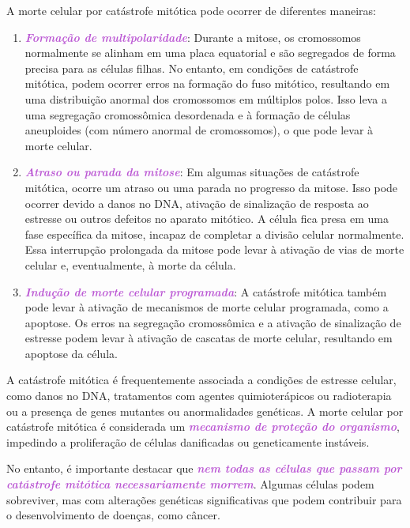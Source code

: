 \documentclass[11pt,a4paper]{article}
\begin{document}
\begin{itemize}
		A morte celular por catástrofe mitótica pode ocorrer de diferentes maneiras:
		\begin{enumerate}
			\item \textcolor{MediumOrchid}{\textbf{\textit{Formação de multipolaridade}}}: Durante a mitose, os cromossomos normalmente se alinham em uma placa equatorial e são segregados de forma precisa para as células filhas. No entanto, em condições de catástrofe mitótica, podem ocorrer erros na formação do fuso mitótico, resultando em uma distribuição anormal dos cromossomos em múltiplos polos. Isso leva a uma segregação cromossômica desordenada e à formação de células aneuploides (com número anormal de cromossomos), o que pode levar à morte celular.
			\item \textcolor{MediumOrchid}{\textbf{\textit{Atraso ou parada da mitose}}}: Em algumas situações de catástrofe mitótica, ocorre um atraso ou uma parada no progresso da mitose. Isso pode ocorrer devido a danos no DNA, ativação de sinalização de resposta ao estresse ou outros defeitos no aparato mitótico. A célula fica presa em uma fase específica da mitose, incapaz de completar a divisão celular normalmente. Essa interrupção prolongada da mitose pode levar à ativação de vias de morte celular e, eventualmente, à morte da célula.
			\item \textcolor{MediumOrchid}{\textbf{\textit{Indução de morte celular programada}}}: A catástrofe mitótica também pode levar à ativação de mecanismos de morte celular programada, como a apoptose. Os erros na segregação cromossômica e a ativação de sinalização de estresse podem levar à ativação de cascatas de morte celular, resultando em apoptose da célula.
		\end{enumerate}
		
		A catástrofe mitótica é frequentemente associada a condições de estresse celular, como danos no DNA, tratamentos com agentes quimioterápicos ou radioterapia ou a presença de genes mutantes ou anormalidades genéticas. A morte celular por catástrofe mitótica é considerada um \textcolor{MediumOrchid}{\textbf{\textit{mecanismo de proteção do organismo}}}, impedindo a proliferação de células danificadas ou geneticamente instáveis.
		
		No entanto, é importante destacar que \textcolor{MediumOrchid}{\textbf{\textit{nem todas as células que passam por catástrofe mitótica necessariamente morrem}}}. Algumas células podem sobreviver, mas com alterações genéticas significativas que podem contribuir para o desenvolvimento de doenças, como câncer.
	\end{itemize}	
\end{document}
